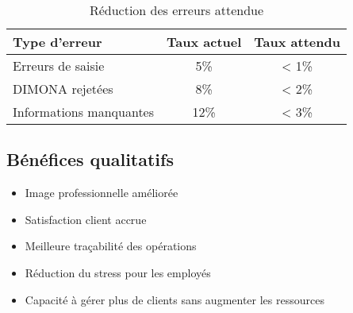 \begin{table}[h]
\centering
\begin{tabular}{|l|c|c|}
\hline
\textbf{Type d'erreur} & \textbf{Taux actuel} & \textbf{Taux attendu} \\
\hline
Erreurs de saisie & 5\% & < 1\% \\
DIMONA rejetées & 8\% & < 2\% \\
Informations manquantes & 12\% & < 3\% \\
\hline
\end{tabular}
\caption{Réduction des erreurs attendue}
\end{table}

\subsection{Bénéfices qualitatifs}

\begin{itemize}
  \item Image professionnelle améliorée
  \item Satisfaction client accrue
  \item Meilleure traçabilité des opérations
  \item Réduction du stress pour les employés
  \item Capacité à gérer plus de clients sans augmenter les ressources
\end{itemize}